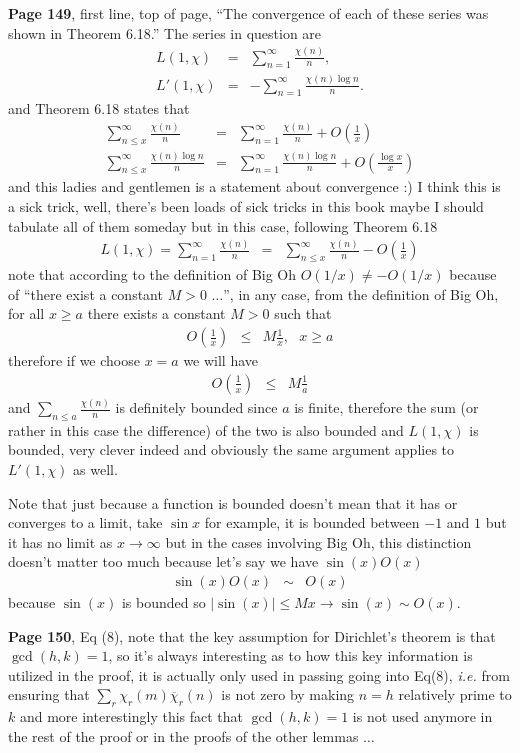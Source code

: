 \documentclass[aps,preprint,preprintnumbers,nofootinbib,showpacs,prd]{revtex4-1}
\newcommand{\ie}{{\it i.e.} }
\newcommand{\nbea}{\begin{eqnarray*}}
\newcommand{\neea}{\end{eqnarray*}}
\begin{document}
{\bf Page 149}, first line, top of page, ``The convergence of each of these series was shown in Theorem 6.18.'' The series in question are
%
\nbea
L(1,\chi) & = & \sum_{n=1}^\infty \frac{\chi(n)}{n}, \\
L'(1,\chi) & = & -\sum_{n=1}^\infty \frac{\chi(n)\log n}{n}.
\neea
%
and Theorem 6.18 states that
%
\nbea
\sum_{n\le x}^\infty \frac{\chi(n)}{n} & = & \sum_{n=1}^\infty \frac{\chi(n)}{n} + O\left(\frac{1}{x}\right) \\
\sum_{n\le x}^\infty \frac{\chi(n)\log n}{n} & = & \sum_{n=1}^\infty \frac{\chi(n)\log n}{n} + O\left(\frac{\log x}{x}\right)
\neea
%
and this ladies and gentlemen is a statement about convergence :) I think this is a sick trick, well, there's been loads of sick tricks in this book maybe I should tabulate all of them someday but in this case, following Theorem 6.18
%
\nbea
L(1,\chi) = \sum_{n=1}^\infty \frac{\chi(n)}{n} & = & \sum_{n\le x}^\infty \frac{\chi(n)}{n} - O\left(\frac{1}{x}\right)
\neea
%
note that according to the definition of Big Oh $O(1/x) \neq -O(1/x)$ because of ``there exist a constant $M>0$ $\ldots$'',  in any case, from the definition of Big Oh, for all $x \ge a$ there exists a constant $M>0$ such that
%
\nbea
O\left( \frac{1}{x}\right ) &\le& M \frac{1}{x}, ~~~ x \ge a
\neea
%
therefore if we choose $x=a$ we will have
%
\nbea
O\left( \frac{1}{x}\right ) &\le& M \frac{1}{a}
\neea
%
and $\sum_{n \le a}\frac{\chi(n)}{n}$ is definitely bounded since $a$ is finite, therefore the sum (or rather in this case the difference) of the two is also bounded and $L(1,\chi)$ is bounded, very clever indeed and obviously the same argument applies to $L'(1,\chi)$ as well.

Note that just because a function is bounded doesn't mean that it has or converges to a limit, take $\sin x$ for example, it is bounded between $-1$ and $1$ but it has no limit as $x\to\infty$ but in the cases involving Big Oh, this distinction doesn't matter too much because let's say we have $\sin(x) O(x)$
%
\nbea
\sin (x) O(x) & \sim & O(x)
\neea
%
because $\sin(x)$ is bounded so $|\sin(x)| \le M x \to \sin(x) \sim O(x)$.

{\bf Page 150}, Eq (8), note that the key assumption for Dirichlet's theorem is that $\gcd(h,k)=1$, so it's always interesting as to how this key information is utilized in the proof, it is actually only used in passing going into Eq(8), \ie from ensuring that $\sum_r \chi_r(m)\overline\chi_r(n)$ is not zero by making $n=h$ relatively prime to $k$ and more interestingly this fact that $\gcd(h,k)=1$ is not used anymore in the rest of the proof or in the proofs of the other lemmas $\ldots$
\end{document}
